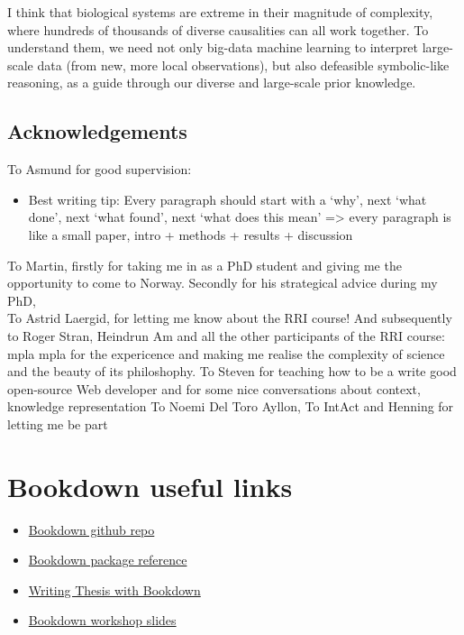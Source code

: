 \documentclass[
  12pt,
]{book}
\providecommand{\tightlist}{%
  \setlength{\itemsep}{0pt}\setlength{\parskip}{0pt}}
\begin{document}
I think that biological systems are extreme in their magnitude of complexity, where hundreds of thousands of diverse causalities can all work together.
To understand them, we need not only big-data machine learning to interpret large-scale data (from new, more local observations), but also defeasible symbolic-like reasoning, as a guide through our diverse and large-scale prior knowledge.

\hypertarget{acknowledgements}{%
\section*{Acknowledgements}\label{acknowledgements}}

To Asmund for good supervision:

\begin{itemize}
\tightlist
\item
  Best writing tip: Every paragraph should start with a `why', next `what done', next `what found', next `what does this mean' =\textgreater{} every paragraph is like a small paper, intro + methods + results + discussion
\end{itemize}

To Martin, firstly for taking me in as a PhD student and giving me the opportunity to come to Norway. Secondly for his strategical advice during my PhD,\\
To Astrid Laergid, for letting me know about the RRI course!
And subsequently to Roger Stran, Heindrun Am and all the other participants of the RRI course: mpla mpla for the expericence and making me realise the complexity of science and the beauty of its philoshophy.
To Steven for teaching how to be a write good open-source Web developer and for some nice conversations about context, knowledge representation
To Noemi Del Toro Ayllon,
To IntAct and Henning for letting me be part

\hypertarget{appendix-appendix}{%
\appendix}


\hypertarget{bookdown-useful-links}{%
\chapter*{Bookdown useful links}\label{bookdown-useful-links}}

\begin{itemize}
\tightlist
\item
  \href{https://github.com/rstudio/bookdown/}{Bookdown github repo}
\item
  \href{https://bookdown.org/yihui/bookdown/}{Bookdown package reference}
\item
  \href{https://eddjberry.netlify.com/post/writing-your-thesis-with-bookdown/}{Writing Thesis with Bookdown}
\item
  \href{https://arm.rbind.io/slides/bookdown.html}{Bookdown workshop slides}
\end{itemize}
\end{document}
